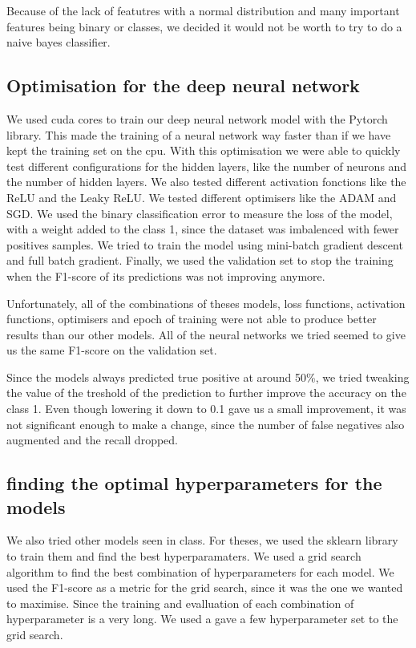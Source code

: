 \documentclass{article} %
\begin{document}
Because of the lack of featutres with a normal distribution and many important features being binary or classes,
we decided it would not be worth to try to do a naive bayes classifier.

\subsection{Optimisation for the deep neural network}
We used cuda cores to train our deep neural network model with the Pytorch library.
This made the training of a neural network way faster than if we have kept the training set on the cpu.
With this optimisation we were able to quickly test different configurations for the hidden layers,
like the number of neurons and the number of hidden layers.
We also tested different activation fonctions like the ReLU and the Leaky ReLU.
We tested different optimisers like the ADAM and SGD.
We used the binary classification error to measure the loss of the model,
with a weight added to the class 1, since the dataset was imbalenced with fewer positives samples.
We tried to train the model using mini-batch gradient descent and full batch gradient.
Finally, we used the validation set to stop the training when the F1-score of its predictions was not improving anymore.


Unfortunately, all of the combinations of theses models, loss functions, activation functions, optimisers and epoch of training were not able to produce
better results than our other models. All of the neural networks we tried seemed to give us the same F1-score on the validation set.

Since the models always predicted true positive at around 50\%, we tried tweaking the value of the treshold
of the prediction to further improve the accuracy on the class 1. Even though lowering it down to 0.1 gave us a small improvement,
it was not significant enough to make a change, since the number of false negatives also augmented and the recall dropped.


\subsection{finding the optimal hyperparameters for the models}
We also tried other models seen in class. For theses, we used the sklearn library to train them and find
the best hyperparamaters. We used a grid search algorithm to find the best combination of hyperparameters
for each model. We used the F1-score as a metric for the grid search, since it was the one we wanted to maximise.
Since the training and evalluation of each combination of hyperparameter is a very long. We used a gave a few hyperparameter
set to the grid search. 
\end{document}
